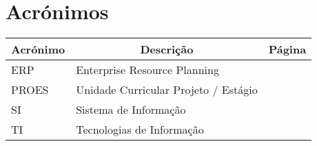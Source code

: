 

\chapter[Acrónimos]{Acrónimos}

\begin{center}
\small
\begin{longtable}{lp{3.0in}c}
\toprule \multicolumn{1}{c}{Acrónimo} 
                & \multicolumn{1}{c}{Descrição}
                                & \multicolumn{1}{c}{Página}\\ \midrule\addlinespace[2pt] \endhead

\bottomrule\endfoot

ERP		& Enterprise Resource Planning			& \pageref{sym:ERP}\\
PROES	& Unidade Curricular Projeto / Estágio	& \pageref{sym:PROES}\\
SI		& Sistema de Informação					& \pageref{sym:SI}\\
TI		& Tecnologias de Informação				& \pageref{sym:TI}\\


\end{longtable}

\end{center}

